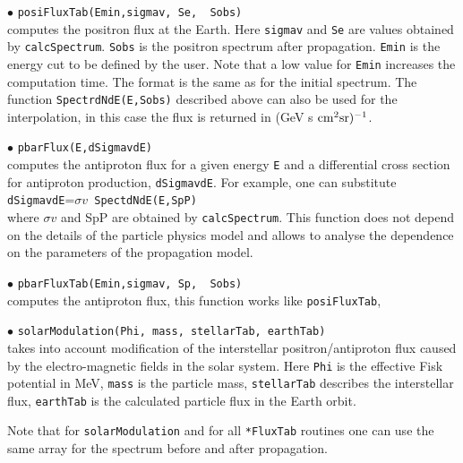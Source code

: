 \documentclass[12pt,a4paper]{article}
\begin{document}
\noindent  
$\bullet$ \verb|posiFluxTab(Emin,sigmav, Se,  Sobs)|\\
computes the positron flux at the Earth. Here \verb|sigmav| and \verb|Se| are values obtained by 
\verb|calcSpectrum|.  \verb|Sobs| is the positron spectrum after propagation. \verb|Emin| is the energy cut to be defined by the user. Note that
a low value for \verb|Emin| increases the computation time.
The  format is the same as for the initial spectrum. The function  
\verb|SpectrdNdE(E,Sobs)| described above can also be used for the interpolation, in this case the flux is
returned in (GeV s ${\rm cm}^2 {\rm sr})^{-1}$. 

\noindent
$\bullet$ \verb|pbarFlux(E,dSigmavdE)|\\
computes the antiproton flux for a given energy {\tt E} and a 
differential cross section for antiproton production, {\tt dSigmavdE}.
For example, one can substitute\\ {\tt dSigmavdE}=$\sigma v${\tt
SpectdNdE(E,SpP)} \\
where $ \sigma v$ and {SpP} are obtained by {\tt calcSpectrum}.
This function does not depend on the details of the particle physics  model and allows to analyse the dependence on the
parameters of the propagation model.

\noindent
$\bullet$ \verb|pbarFluxTab(Emin,sigmav, Sp,  Sobs)|\\
computes the antiproton flux, this function works like \verb|posiFluxTab|,

\noindent
$\bullet$ \verb|solarModulation(Phi, mass, stellarTab, earthTab)|\\
takes into account modification of the interstellar positron/antiproton flux 
caused by the electro-magnetic fields in the solar system. Here \verb|Phi| is the
effective Fisk potential in MeV, \verb|mass| is the particle mass,
\verb|stellarTab| describes the interstellar flux, \verb|earthTab| 
is the calculated particle flux in the Earth orbit.

Note that for \verb|solarModulation| and for  all \verb|*FluxTab| 
routines one can use  the same array for the spectrum before and after propagation. 

\end{document}
